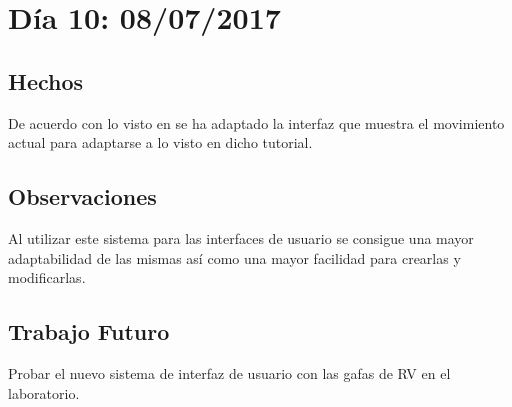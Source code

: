 \documentclass[12pt,a4paper]{article}
\begin{document}
\section{Día 10: 08/07/2017}

\subsection{Hechos}

De acuerdo con lo visto en \cite{Unity Tutorials} se ha adaptado la interfaz que muestra el movimiento actual para adaptarse a lo visto en dicho tutorial.

\subsection{Observaciones}

Al utilizar este sistema para las interfaces de usuario se consigue una mayor adaptabilidad de las mismas así como una mayor facilidad para crearlas y modificarlas.

\subsection{Trabajo Futuro}

Probar el nuevo sistema de interfaz de usuario con las gafas de RV en el laboratorio.


\break
\end{document}
